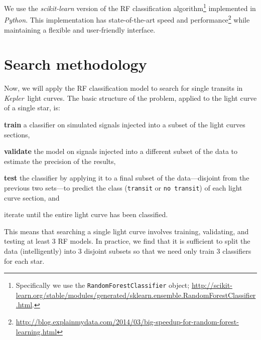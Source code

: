 \documentclass[12pt,preprint]{aastex}
\newcommand{\project}[1]{\textsl{#1}}
\newcommand{\kepler}{\project{Kepler}}
\newcommand{\sectlabel}[1]{\label{sect:#1}}
\begin{document}
We use the \project{scikit-learn} \citep{Pedregosa:2011} version of the RF
classification algorithm\footnote{Specifically we use the
\texttt{RandomForestClassifier} object;
\url{http://scikit-learn.org/stable/modules/generated/sklearn.ensemble.RandomForestClassifier.html}.}
implemented in \project{Python}.
This implementation has state-of-the-art speed and
performance\footnote{\url{http://blog.explainmydata.com/2014/03/big-speedup-for-random-forest-learning.html}}
while maintaining a flexible and user-friendly interface.


\section{Search methodology}\sectlabel{search}

Now, we will apply the RF classification model to search for single transits
in \kepler\ light curves.
The basic structure of the problem, applied to the light curve of a single
star, is:
\begin{enumerate}

{\item {\bf train} a classifier on simulated signals injected into a subset of
the light curves sections,}

{\item {\bf validate} the model on signals injected into a different subset of
the data to estimate the precision of the results,}

{\item {\bf test} the classifier by applying it to a final subset of the
data---disjoint from the previous two sets---to predict the class
(\texttt{transit} or \texttt{no transit}) of each light curve section, and}

{\item iterate until the entire light curve has been classified.}

\end{enumerate}
This means that searching a single light curve involves training, validating,
and testing at least 3 RF models.
In practice, we find that it is sufficient to split the data (intelligently)
into 3 disjoint subsets so that we need only train 3 classifiers for each
star.
\end{document}
